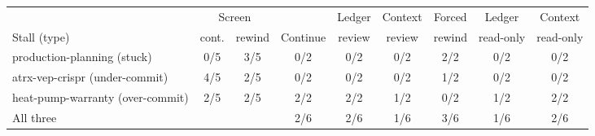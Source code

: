 \begin{tabular}{@{}lcc|cccccc@{}}
\toprule
& \multicolumn{2}{c|}{Screen} & & Ledger & Context & Forced & Ledger & Context \\
Stall (type) & cont. & rewind & Continue & review & review & rewind & read-only & read-only \\
\midrule
production-planning (stuck) & 0/5 & 3/5 & 0/2 & 0/2 & 0/2 & 2/2 & 0/2 & 0/2 \\
atrx-vep-crispr (under-commit) & 4/5 & 2/5 & 0/2 & 0/2 & 0/2 & 1/2 & 0/2 & 0/2 \\
heat-pump-warranty (over-commit) & 2/5 & 2/5 & 2/2 & 2/2 & 1/2 & 0/2 & 1/2 & 2/2 \\
\midrule All three & & & 2/6 & 2/6 & 1/6 & 3/6 & 1/6 & 2/6 \\
\bottomrule
\end{tabular}

